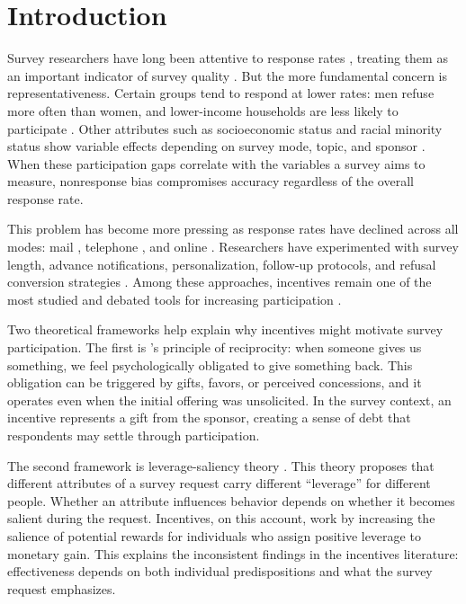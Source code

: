 
\section{Introduction}

Survey researchers have long been attentive to response rates \parencite{Steeh1981},
treating them as an important indicator of survey quality
\parencite{Backstrom.Hursh-Cesar1963, Babbie1990, Aday1996, Rea.Parker1997}.
But the more fundamental concern is representativeness. Certain groups tend to respond
at lower rates: men refuse more often than women, and lower-income households are less
likely to participate \parencite{Groves2006, Rothbaum.Bee2024}. Other attributes such as
socioeconomic status and racial minority status show variable effects depending on survey
mode, topic, and sponsor \parencite{Groves2006}. When these participation gaps correlate
with the variables a survey aims to measure, nonresponse bias compromises accuracy
regardless of the overall response rate.

This problem has become more pressing as response rates have declined across all modes:
mail \parencite{CASRO1982}, telephone \parencite{Curtin.etal2005}, and online
\parencite{Sheehan2001}. Researchers have experimented with survey length, advance
notifications, personalization, follow-up protocols, and refusal conversion strategies
\parencite{Brick.Williams2013}. Among these approaches, incentives remain one of the most studied
and debated tools for increasing participation \parencite{Singer.Ye2013a}.

Two theoretical frameworks help explain why incentives might motivate survey
participation. The first is \textcite{Cialdini1984}'s principle of reciprocity: when
someone gives us something, we feel psychologically obligated to give something back.
This obligation can be triggered by gifts, favors, or perceived concessions, and it
operates even when the initial offering was unsolicited. In the survey context, an
incentive represents a gift from the sponsor, creating a sense of debt that respondents
may settle through participation.

The second framework is leverage-saliency theory \parencite{Groves.etal2000a}. This theory
proposes that different attributes of a survey request carry different ``leverage'' for
different people. Whether an attribute influences behavior depends on whether it becomes
salient during the request. Incentives, on this account, work by increasing the salience
of potential rewards for individuals who assign positive leverage to monetary gain. This
explains the inconsistent findings in the incentives literature: effectiveness depends on
both individual predispositions and what the survey request emphasizes.

